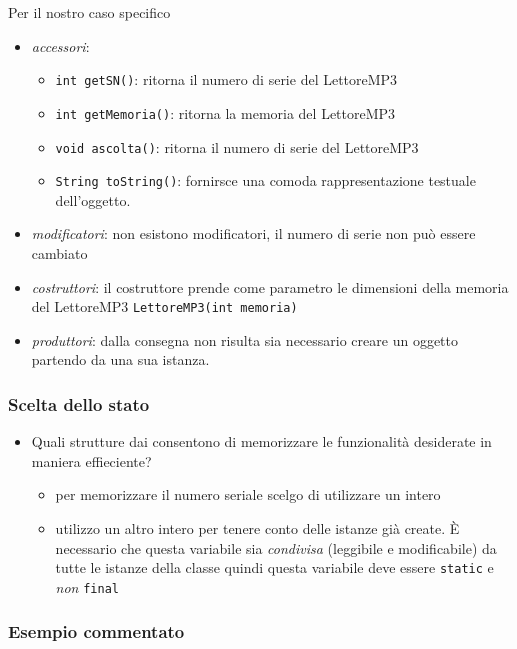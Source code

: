 \documentclass{article}
\begin{document}
Per il nostro caso specifico
\begin{itemize}
\item \emph{accessori}: 
\begin{itemize}
\item \texttt{int getSN()}: ritorna il numero di serie del LettoreMP3
\item \texttt{int getMemoria()}: ritorna la memoria del LettoreMP3
\item \texttt{void ascolta()}: ritorna il numero di serie del LettoreMP3
\item \texttt{String toString()}:  fornirsce una comoda rappresentazione testuale dell'oggetto.
\end{itemize}
\item \emph{modificatori}: non esistono modificatori, il numero di serie non pu\`o essere cambiato
\item \emph{costruttori}: il costruttore prende come parametro le dimensioni della memoria del LettoreMP3 \texttt{LettoreMP3(int memoria)}
\item \emph{produttori}: dalla consegna non risulta sia necessario creare un oggetto partendo da una sua istanza.
\end{itemize}


\subsubsection{Scelta dello stato}
\begin{itemize}
\item Quali strutture dai consentono di memorizzare le funzionalit\`a desiderate in maniera effieciente?
\begin{itemize}
\item per memorizzare il numero seriale scelgo di utilizzare un intero
\item utilizzo un altro intero per tenere conto delle istanze gi\`a create. \`E necessario che questa variabile sia \emph{condivisa} (leggibile e modificabile) da tutte le istanze della classe quindi questa variabile deve essere \texttt{static} e \emph{non} \texttt{final}
\end{itemize}
\end{itemize}



\subsubsection{Esempio commentato}

\end{document}
